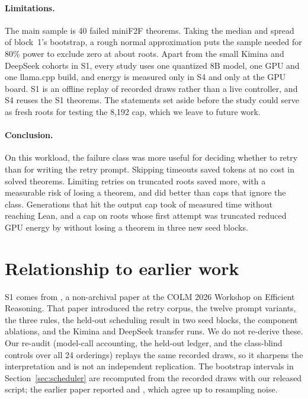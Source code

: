 \paragraph{Limitations.}
The main sample is 40 failed miniF2F theorems.  Taking the median and spread of block~1's bootstrap, a rough normal approximation puts the sample needed for 80\% power to exclude zero at about \CrPowerRoots{} roots.  Apart from the small Kimina and DeepSeek cohorts in S1, every study uses one quantized 8B model, one GPU and one llama.cpp build, and energy is measured only in S4 and only at the GPU board.  S1 is an offline replay of recorded draws rather than a live controller, and S4 reuses the S1 theorems.  The \MiniFTwoFExcluded{} statements set aside before the study could serve as fresh roots for testing the 8,192 cap, which we leave to future work.

\paragraph{Conclusion.}
On this workload, the failure class was more useful for deciding whether to retry than for writing the retry prompt.  Skipping timeouts saved tokens at no cost in solved theorems.  Limiting retries on truncated roots saved more, with a measurable risk of losing a theorem, and did better than caps that ignore the class.  Generations that hit the output cap took \TruncatedTotalShare{} of measured time without reaching Lean, and a cap on roots whose first attempt was truncated reduced GPU energy by \CrCapEnergyPooled{} without losing a theorem in three new seed blocks.




\appendix

\section{Relationship to earlier work}
\label{app:relationship}

S1 comes from \citet{reddy2026scheduling}, a non-archival paper at the COLM 2026 Workshop on Efficient Reasoning.  That paper introduced the retry corpus, the twelve prompt variants, the three rules, the held-out scheduling result in two seed blocks, the component ablations, and the Kimina and DeepSeek transfer runs.  We do not re-derive these.  Our re-audit (model-call accounting, the held-out ledger, and the class-blind controls over all 24 orderings) replays the same recorded draws, so it sharpens the interpretation and is not an independent replication.  The bootstrap intervals in Section~\ref{sec:scheduler} are recomputed from the recorded draws with our released script; the earlier paper reported \SchedBOneBoot{} and \SchedBTwoBoot{}, which agree up to resampling noise.

